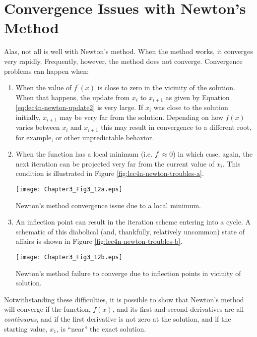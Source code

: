 \section{Convergence Issues with Newton's Method}
Alas, not all is well with Newton's method.  When the method works, it converges very rapidly.  Frequently, however, the method does not converge.  Convergence problems can happen when:
\begin{enumerate}
\item When the value of $f^{\prime}(x)$ is close to zero in the vicinity of the solution.  When that happens, the update from $x_i$ to $x_{i+1}$ as given by Equation \ref{eq:lec4n-newton-update2} is very large.  If $x_i$ was close to the solution initially, $x_{i+1}$ may be very far from the solution.  Depending on how $f(x)$ varies between $x_i$ and $x_{i+1}$ this may result in convergence to a different root, for example, or other unpredictable behavior.

\item When the function has a local minimum (i.e. $f^{\prime} \approx 0$) in which case, again, the next iteration can be projected very far from the current value of $x_i$.  This condition is illustrated in Figure \ref{fig:lec4n-newton-troubles-a}.
\begin{marginfigure}
\texttt{[image: Chapter3\_Fig3\_12a.eps]}
\caption{Newton's method convergence issue due to a local minimum.}
\label{fig:lec4n-newton-troubles-a}
\end{marginfigure}

\item An inflection point can result in the iteration scheme entering into a cycle.  A schematic of this diabolical (and, thankfully, relatively uncommon) state of affairs is shown in Figure \ref{fig:lec4n-newton-troubles-b}.

\begin{marginfigure}
\texttt{[image: Chapter3\_Fig3\_12b.eps]}
\caption{Newton's method failure to converge due to inflection points in vicinity of solution.}
\label{fig:lec4n-newton-troubles-b}
\end{marginfigure}


\end{enumerate}
Notwithstanding these difficulties, it is possible to show that Newton's method will converge if the function, $f(x)$, and its first and second derivatives are all \emph{continuous}, and if the first derivative is not zero at the solution, and if the starting value, $x_1$, is ``near'' the exact solution.

